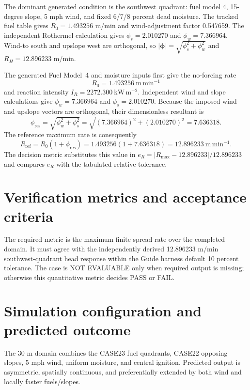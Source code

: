 The dominant generated condition is the southwest quadrant: fuel model 4, 15-degree slope, 5 mph wind, and fixed 6/7/8 percent dead moisture. The tracked fuel table gives \(R_0=1.493256\) m/min and wind-adjustment factor 0.547659. The independent Rothermel calculation gives \(\phi_s=2.010270\) and \(\phi_w=7.366964\). Wind-to south and upslope west are orthogonal, so \(|\boldsymbol{\phi}|=\sqrt{\phi_s^2+\phi_w^2}\) and \(R_H=12.896233\) m/min.

The generated Fuel Model~4 and moisture inputs first give the no-forcing
rate\[R_0=1.493256~\mathrm{m\,min^{-1}}\]and reaction intensity
\(I_R=2272.300~\mathrm{kW\,m^{-2}}\).  Independent wind and slope
calculations give \(\phi_w=7.366964\) and \(\phi_s=2.010270\).
Because the imposed wind and upslope vectors are orthogonal, their
dimensionless resultant is
\[
 \phi_{\mathrm{res}}=\sqrt{\phi_w^2+\phi_s^2}
 =\sqrt{(7.366964)^2+(2.010270)^2}=7.636318.
\]
The reference maximum rate is consequently
\[
 R_{\mathrm{ref}}=R_0(1+\phi_{\mathrm{res}})
 =1.493256(1+7.636318)=12.896233~\mathrm{m\,min^{-1}}.
\]
The decision metric substitutes this value in
\(e_R=|R_{\max}-12.896233|/12.896233\) and compares \(e_R\) with the
tabulated relative tolerance.

\section{Verification metrics and acceptance criteria}

The required metric is the maximum finite spread rate over the completed domain. It must agree with the independently derived 12.896233 m/min southwest-quadrant head response within the Guide harness default 10 percent tolerance. The case is NOT EVALUABLE only when required output is missing; otherwise this quantitative metric decides PASS or FAIL.

\section{Simulation configuration and predicted outcome}

The 30 m domain combines the CASE23 fuel quadrants, CASE22 opposing slopes, 5 mph wind, uniform moisture, and central ignition. Predicted output is asymmetric, spatially continuous, and preferentially extended by both wind and locally faster fuels/slopes.

